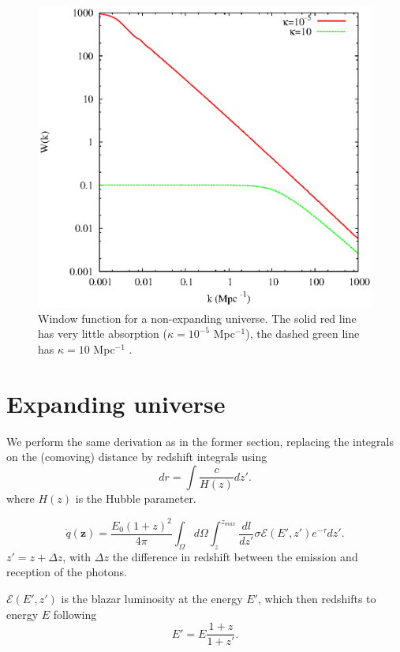 \documentclass[twocolumns]{emulateapj}
\begin{document}
\begin{figure}
  \centering
  \includegraphics[width = .45\textwidth ]{newtonian_window}
  \caption{Window function for a non-expanding universe. The solid red line has very little absorption ($\kappa=10^{-5}$ Mpc$^{-1}$), the dashed green line has $\kappa=10 $ Mpc$^{-1}$ .}
  \label{fig:window_newt}
\end{figure}



\section{Expanding universe}\label{sec:window_exp}

We perform the same derivation as in the former section, replacing the integrals on the (comoving) distance by redshift integrals using
\begin{equation}
  \label{eq:proper_dist}
  dr=\int \frac{c}{H(z)} dz'.
\end{equation}
where  $H(z)$ is the Hubble parameter.


\begin{equation}
  \label{eq:int_exp_heat}
  \dot{q}(\mathbf{z})=\frac{E_0(1+z)^2}{4\pi}\int_{\Omega}d\Omega\int_z^{z_{max}}\frac{dl}{dz'}\sigma\mathcal{E}(E',z') e^{-\tau} dz'.
\end{equation}
 $z'=z+\Delta z$, with $\Delta z$ the difference in redshift between the emission and reception of the photons.

$\mathcal{E}(E',z')$ is  the   blazar luminosity at the energy $E'$,  which then redshifts to energy $E$ following 
\begin{equation}
  \label{eq:E_z}
  E'=E\frac{1+z}{1+z'}.
\end{equation}
\end{document}
